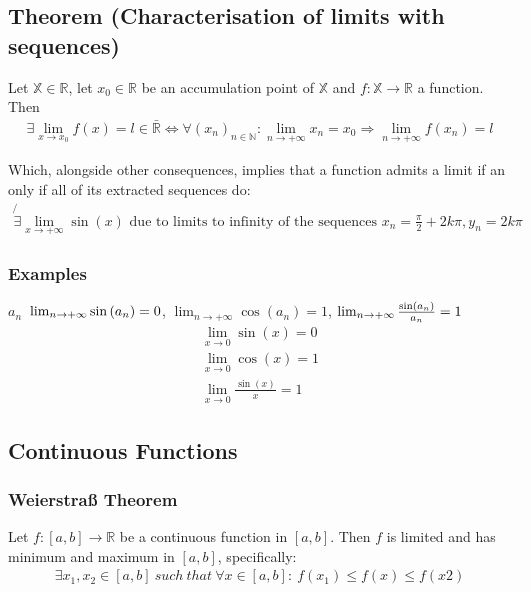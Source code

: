 \documentclass[a4paper]{report}
\begin{document}
\subsection{\textbf{Theorem (Characterisation of limits with sequences)}}
\begin{tcolorbox}
Let $\mathbb{X}\in\mathbb{R}$, let $x_{0}\in\mathbb{R}$ be an accumulation point of $\mathbb{X}$  and $f:\mathbb{X}\rightarrow\mathbb{R}$ a function. Then
\tcblower
\begin{align}
    \exists \lim_{x\rightarrow x_{0}} f\left ( x \right )=l\in\mathbb{\bar{R}} \Leftrightarrow \forall \left ( x_{n} \right )_{n\in\mathbb{N}}:\lim_{n \to +\infty} x_{n}=x_{0}\Rightarrow \lim_{n \to +\infty} f\left ( x_{n} \right )=l
\end{align}
\end{tcolorbox}
Which, alongside other consequences, implies that a function admits a limit if an only if all of its extracted sequences do:
\begin{align}
    \not{\exists }\lim_{x\rightarrow +\infty}\sin\left ( x \right ) \text{ due to limits to infinity of the sequences } x_{n}=\frac{\pi}{2} + 2k\pi, y_{n} = 2k\pi
\end{align} 
\subsubsection{\textbf{Examples}}
 $a_{n}$  $\\\lim_{n \to +\infty} \sin\left ( a_{n} \right ) = 0$, $\lim_{n \to +\infty} \cos\left ( a_{n} \right ) = 1$, $\lim_{n \to +\infty}\frac{ \sin\left ( a_{n} \right )}{a_{n}} = 1\\$
\begin{align}
    \lim_{x\rightarrow 0}\sin\left ( x \right )=0\\
    \lim_{x\rightarrow 0}\cos\left ( x \right )=1\\
    \lim_{x \to 0}\frac{ \sin\left ( x \right )}{x} = 1
\end{align}
\subsection{\textbf{Continuous Functions}}
\subsubsection{\textbf{Weierstraß Theorem}}
\begin{tcolorbox}
Let $f:\left [ a,b \right ]\rightarrow \mathbb{R}$ be a continuous function in $\left [ a,b \right ]$. Then $f$ is limited and has minimum and maximum in $\left [ a,b \right ]$, specifically:
\tcblower
\begin{align}
    \exists x_{1},x_{2}\in \left [ a,b \right ]\ such\ that\ \forall x\in\left [ a,b \right ]:\ f\left ( x_{1} \right )\leq f\left ( x \right )\leq f\left ( x2 \right )
\end{align}
\end{tcolorbox}
\end{document}
